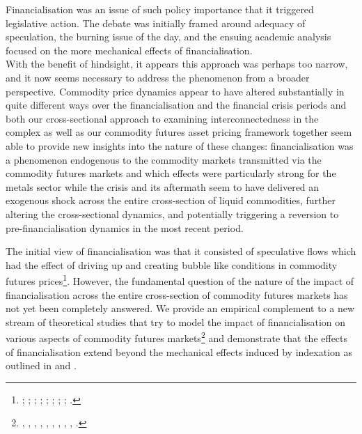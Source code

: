 \documentclass[
  authoryear,
  preprint,
  3p]{elsarticle}
\begin{document}
\bigskip
\bigskip

Financialisation was an issue of such policy importance that it
triggered legislative action. The debate was initially framed around
adequacy of speculation, the burning issue of the day, and the ensuing
academic analysis focused on the more mechanical effects of
financialisation.\\
With the benefit of hindsight, it appears this approach was perhaps too
narrow, and it now seems necessary to address the phenomenon from a
broader perspective. Commodity price dynamics appear to have altered
substantially in quite different ways over the financialisation and the
financial crisis periods and both our cross-sectional approach to
examining interconnectedness in the complex as well as our commodity
futures asset pricing framework together seem able to provide new
insights into the nature of these changes: financialisation was a
phenomenon endogenous to the commodity markets transmitted via the
commodity futures markets and which effects were particularly strong for
the metals sector while the crisis and its aftermath seem to have
delivered an exogenous shock across the entire cross-section of liquid
commodities, further altering the cross-sectional dynamics, and
potentially triggering a reversion to pre-financialisation dynamics in
the most recent period.

The initial view of financialisation was that it consisted of
speculative flows which had the effect of driving up and creating bubble
like conditions in commodity futures prices\footnote{\citet{masters_testimony_2008};
  \citet{masters_accidental_2008}; \citet{unctad_global_2009};
  \citet{deschutter_food_2010}; \citet{gilbert_how_2010};
  \citet{gilbert_speculative_2010}; \citet{herman_not_2011};
  \citet{schumann_hunger_2011}; \citet{singleton_investor_2013}.}.
However, the fundamental question of the nature of the impact of
financialisation across the entire cross-section of commodity futures
markets has not yet been completely answered. We provide an empirical
complement to a new stream of theoretical studies that try to model the
impact of financialisation on various aspects of commodity futures
markets\footnote{\citet{etula_broker-dealer_2013},
  \citet{acharya_limits_2013}, \citet{cheng_convective_2014},
  \citet{leclercq_equilibrium_2014}, \citet{sockin_informational_2015},
  \citet{goldstein_speculation_2014}, \citet{ekeland_speculation_2014},
  \citet{goldstein_commodity_2022}, \citet{ekeland_hedging_2019},
  \citet{isleimeyyeh_role_2020}.} and demonstrate that the effects of
financialisation extend beyond the mechanical effects induced by
indexation as outlined in \citet{tang_index_2012} and
\citet{basak_model_2016}.
\end{document}
